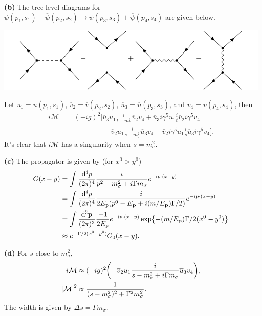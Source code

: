 \documentclass{article}
\makeatletter
\newcommand*{\shifttext}[1]{%
  \settowidth{\@tempdima}{#1}%
  \hspace{-\@tempdima}#1%
}
\newcommand{\plabel}[1]{%
\shifttext{\textbf{#1}\quad}%
}
\makeatother
\begin{document}
\plabel{(b)}%
The tree level diagrams for $\psi(p_1,s_1)+\overline{\psi}(p_2,s_2)\rightarrow \psi(p_3,s_3)+\overline{\psi}(p_4,s_4)$ are given below.
\begin{center}
    \includegraphics{img/yukawa/bhabha/bhabha.pdf}
\end{center}
Let $u_1 = u(p_1,s_1)$, $\overline{v}_2 = \overline{v}(p_2,s_2)$, $\overline{u}_3 = \overline{u}(p_3,s_3)$, and $v_4 = v(p_4, s_4)$, then
\begin{align*}
    i\mathcal{M} &= (-ig)^2 \biggl[ \overline{u}_3 u_1 \frac{i}{t - m^2_\sigma} \overline{v}_2 v_4 + \overline{u}_3 i\gamma^5 u_1 \frac{i}{t} \overline{v}_2 i\gamma^5 v_4 \\
    &\phantom{{}={}(-ig)^2\biggl[} - \overline{v}_2 u_1 \frac{i}{s-m_\sigma^2} \overline{u}_3 v_4 - \overline{v}_2 i\gamma^5 u_1 \frac{i}{s} \overline{u}_3 i\gamma^5 v_4 \biggr].
\end{align*}
It's clear that $i\mathcal{M}$ has a singularity when $s = m_\sigma^2$.

\plabel{(c)}%
The propagator is given by (for $x^0>y^0$)
\begin{align*}
    G(x-y) &= \int \frac{\dd[4]{p}}{(2\pi)^4} \frac{i}{p^2 - m_\sigma^2 + i\Gamma m_\sigma} e^{-ip\cdot(x-y)} \\
    &= \int \frac{\dd[4]{p}}{(2\pi)^4} \frac{i}{2E_{\vb{p}}(p^0 - E_{\vb{p}}+i(m/E_{\vb{p}})\Gamma/2)} e^{-ip\cdot(x-y)} \\
    &= \int \frac{\dd[3]{\vb{p}}}{(2\pi)^3} \frac{-1}{2 E_{\vb{p}}} e^{-ip\cdot (x-y)} \exp{-(m/E_{\vb{p}})\Gamma/2 (x^0 - y^0)} \\
    &\approx e^{-\Gamma/2 (x^0 - y^0)} G_0(x-y).
\end{align*}

\plabel{(d)}%
For $s$ close to $m_\sigma^2$,
\begin{align*}
    i\mathcal{M} &\approx (-ig)^2\qty(-\overline{v}_2 u_1 \frac{i}{s - m_\sigma^2 + i\Gamma m_\sigma} \overline{u}_3 v_4), \\
    \abs{\mathcal{M}}^2 &\propto \frac{1}{(s-m_\sigma^2)^2 + \Gamma^2 m_\sigma^2}.
\end{align*}
The width is given by $\Delta s = \Gamma m_\sigma$.
\end{document}

